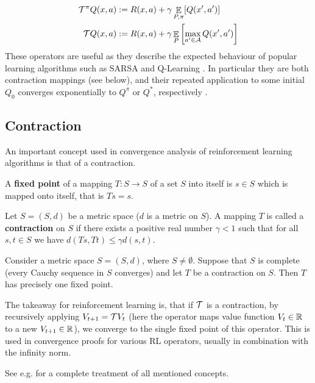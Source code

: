 \begin{align}
\mathcal{T}^\pi Q(x,a) &:= R(x, a) + \gamma \mathop{\mathbb{E}}_{P, \pi} [Q(x',a')]\\
\mathcal{T} Q(x,a) &:= R(x, a) + \gamma \mathop{\mathbb{E}}_{P} \left[ {\max_{a' \in \mathcal{A}}Q(x', a')} \right]\label{eqn:bellmanoptimalityoperator}
\end{align}
These operators are useful as they describe the expected behaviour of popular learning algorithms such as SARSA and Q-Learning \cite{sutton1998reinforcement}. In particular they are both contraction mappings (see below), and their repeated application to some initial $Q_0$ converges exponentially to $Q^\pi$ or $Q^*$, respectively \citep{bertsekas1995neuro}.

\subsection{Contraction}\label{sec:contraction}
An important concept used in convergence analysis of reinforcement learning algorithms is that of a contraction.
\begin{definition}
A \textbf{fixed point} of a mapping $T: S\to S$ of a set $S$ into itself is $s\in S$ which is mapped onto itself, that is $Ts=s$.

Let $S=(S,d)$ be a metric space ($d$ is a metric on $S$). A mapping $T$ is called a \textbf{contraction} on $S$ if there exists a positive real number $\gamma < 1$ such that for all $s, t \in S$ we have $d(Ts, Tt) \le \gamma d(s,t)$.
\end{definition}

\begin{theorem}
Consider a metric space $S=(S,d)$, where $S \neq \emptyset$. Suppose that $S$ is complete (every Cauchy sequence in $S$ converges) and let $T$ be a contraction on $S$. Then $T$ has precisely one fixed point.
\end{theorem}


The takeaway for reinforcement learning is, that if $\mathcal{T}$ is a contraction, by recursively applying $V_{t+1}=\mathcal{T} V_t$ (here the operator maps value function $V_t \in \mathbb{R}$ to a new $V_{t+1} \in \mathbb{R}$), we converge to the single fixed point of this operator. This is used in convergence proofs for various RL operators, usually in combination with the infinity norm.

See e.g. \citet{kreyszig1989introductory} for a complete treatment of all mentioned concepts.



